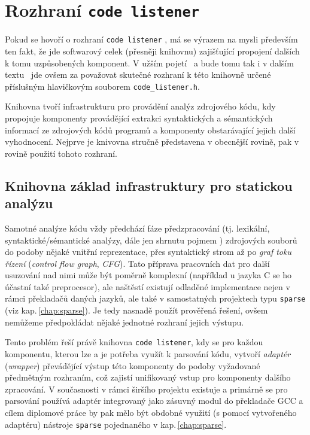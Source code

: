 \chapter{Rozhraní \texttt{code listener}}
\label{chap:code-listener}

Pokud se hovoří o rozhraní \texttt{code listener} \cite{web:FITVUTBR:VeriFIT:CodeListener},
má se výrazem  na mysli především ten fakt, že jde softwarový
celek (přesněji knihovnu) zajišťující propojení dalších k tomu uzpůsobených
komponent. V užším pojetí \ndash\ a bude tomu tak i v dalším textu \ndash\ jde ovšem
za  považovat skutečné rozhraní k této knihovně určené
příslušným hlavičkovým souborem \texttt{code\_listener.h}.

Knihovna tvoří infrastrukturu pro provádění analýz zdrojového kódu, kdy
propojuje komponenty provádějící extrakci syntaktických a sémantických
informací ze zdrojových kódů programů a komponenty obstarávající jejich
další vyhodnocení. Nejprve je knivovna stručně představena v obecnější rovině,
pak v rovině použití tohoto rozhraní.

\section{Knihovna základ infrastruktury pro statickou analýzu}

Samotné analýze kódu vždy předchází fáze předzpracování (tj. lexikální,
syntaktické/sémantické analýzy, dále jen shrnutu pojmem )
zdrojových souborů do podoby nějaké vnitřní reprezentace, přes syntaktický
strom až po \emph{graf toku řízení} (\emph{control flow graph}, \emph{CFG}).
Tato příprava pracovních dat pro další usuzování nad nimi může být
poměrně komplexní (například u jazyka C se ho účastní také preprocesor),
ale naštěstí existují odladěné implementace nejen v rámci překladačů
daných jazyků, ale také v samostatných projektech typu \texttt{sparse}
(viz kap.\,\ref{chap:sparse}). Je tedy nasnadě použít prověřená řešení, ovšem
nemůžeme předpokládat nějaké jednotné rozhraní jejich výstupu.

Tento problém řeší právě knihovna \texttt{code listener}, kdy se pro každou
komponentu, kterou lze a je potřeba využít k parsování kódu, vytvoří
\emph{adaptér} (\emph{wrapper}) převádějící výstup této komponenty
do podoby vyžadované předmětným rozhraním, což zajistí unifikovaný
vstup pro komponenty dalšího zpracování. V současnosti v rámci širšího
projektu existuje a primárně se pro parsování používá adaptér integrovaný
jako zásuvný modul do překladače GCC a cílem diplomové práce
by pak mělo být obdobné využití (s pomocí vytvořeného adaptéru) nástroje
\texttt{sparse} pojednaného v kap.\,\ref{chap:sparse}.

